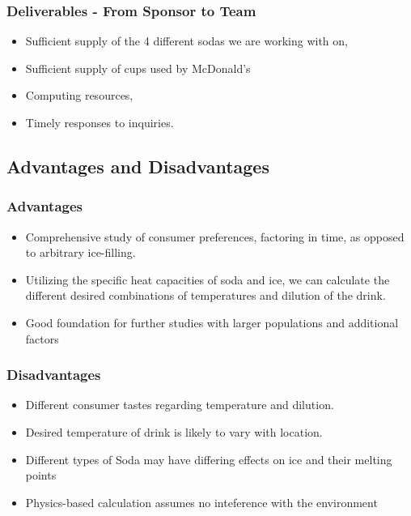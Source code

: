 \documentclass[compress,handout,10pt]{beamer}
\let\olditem\item
\renewcommand{\item}{\setlength{\itemsep}{0.5\baselineskip}\olditem}
\begin{document}
\begin{frame}
    \frametitle{Deliverables - From Sponsor to Team}

\begin{itemize}
    \item Sufficient supply of the 4 different sodas we are working with on,
\item Sufficient supply of cups used by McDonald's
    \item Computing resources,
    \item Timely responses to inquiries.
\end{itemize}
\end{frame}

\subsection{Advantages and Disadvantages}

\begin{frame}
    \frametitle{Advantages}

\begin {itemize}
\item Comprehensive study of consumer preferences, factoring in time, as opposed to arbitrary ice-filling.
\item Utilizing the specific heat capacities of soda and ice, we can calculate the different desired combinations of temperatures and dilution of the drink.
\item Good foundation for further studies with larger populations and additional factors
\end{itemize}

\end{frame}

\begin{frame}
    \frametitle{Disadvantages}

\begin{itemize}
\item Different consumer tastes regarding temperature and dilution. 
\item Desired temperature of drink is likely to vary with location.
\item Different types of Soda may have differing effects on ice and their melting points
\item Physics-based calculation assumes no inteference with the environment
\end{itemize}

\end{frame}
 
\end{document}
